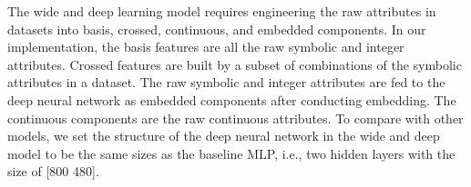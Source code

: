 The wide and deep learning model requires engineering the raw attributes in datasets into basis, crossed, continuous, and embedded components.
In our implementation, the basis features are all the raw symbolic and integer attributes.
Crossed features are built by a subset of combinations of the symbolic attributes in a dataset.
The raw symbolic and integer attributes are fed to the deep neural network as embedded components after conducting embedding.
The continuous components are the raw continuous attributes.
To compare with other models, we set the structure of the deep neural network in the wide and deep model to be the same sizes as the baseline MLP, i.e., two hidden layers with the size of [800 480].

